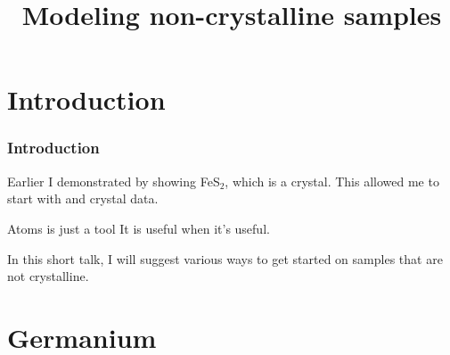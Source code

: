 \documentclass[10pt, xcolor=x11names, compress]{beamer}
\title{Modeling non-crystalline samples}
\begin{document}
\maketitle



\section[Introduction]{Introduction}
\begin{frame}
  \frametitle{Introduction}
  Earlier I demonstrated {\artemis} by showing FeS$_2$, which is a
  crystal.  This allowed me to start with {\atoms} and crystal data.

  \begin{alertblock}{Atoms is just a tool}
    It is useful when it's useful.
  \end{alertblock}

  In this short talk, I will suggest various ways to get started on
  samples that are not crystalline.
\end{frame}

\section{Germanium}
\label{sec:ge}
\end{document}
